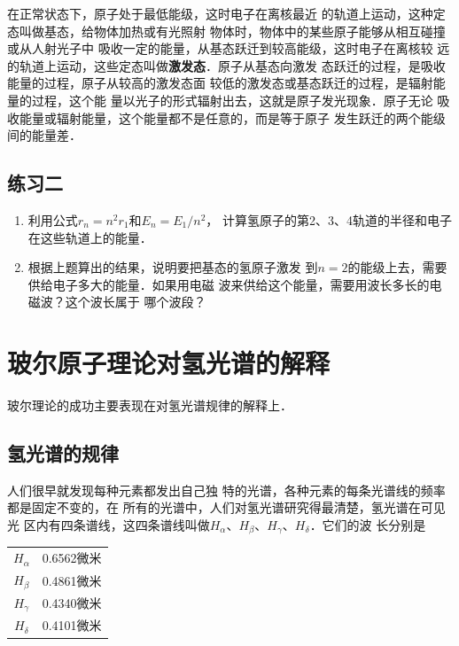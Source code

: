在正常状态下，原子处于最低能级，这时电子在离核最近
的轨道上运动，这种定态叫做基态，给物体加热或有光照射
物体时，物体中的某些原子能够从相互碰撞或从人射光子中
吸收一定的能量，从基态跃迁到较高能级，这时电子在离核较
远的轨道上运动，这些定态叫做\textbf{激发态}．原子从基态向激发
态跃迁的过程，是吸收能量的过程，原子从较高的激发态面
较低的激发态或基态跃迁的过程，是辐射能量的过程，这个能
量以光子的形式辐射出去，这就是原子发光现象．原子无论
吸收能量或辐射能量，这个能量都不是任意的，而是等于原子
发生跃迁的两个能级间的能量差．


\subsection*{练习二}

\begin{enumerate}
    \item 利用公式$r_n=n^2r_1$和$E_n=E_1/n^2$，
计算氢原子的第2、3、4轨道的半径和电子在这些轨道上的能量．
\item 根据上题算出的结果，说明要把基态的氢原子激发
到$n=2$的能级上去，需要供给电子多大的能量．如果用电磁
波来供给这个能量，需要用波长多长的电磁波？这个波长属于
哪个波段？
\end{enumerate}

\section{玻尔原子理论对氢光谱的解释}

玻尔理论的成功主要表现在对氢光谱规律的解释上．

\subsection{氢光谱的规律}

人们很早就发现每种元素都发出自己独
特的光谱，各种元素的每条光谱线的频率都是固定不变的，在
所有的光谱中，人们对氢光谱研究得最清楚，氢光谱在可见光
区内有四条谱线，这四条谱线叫做$H_{\alpha}$、$H_{\beta}$、$H_{\gamma}$、$H_{\delta}$．它们的波
长分别是
\begin{center}
    \begin{tabular}{cc}
        $H_{\alpha}$  &0.6562微米\\
        $H_{\beta}$  &0.4861微米\\
        $H_{\gamma}$  &0.4340微米\\
        $H_{\delta}$  &0.4101微米\\
    \end{tabular}
\end{center}

